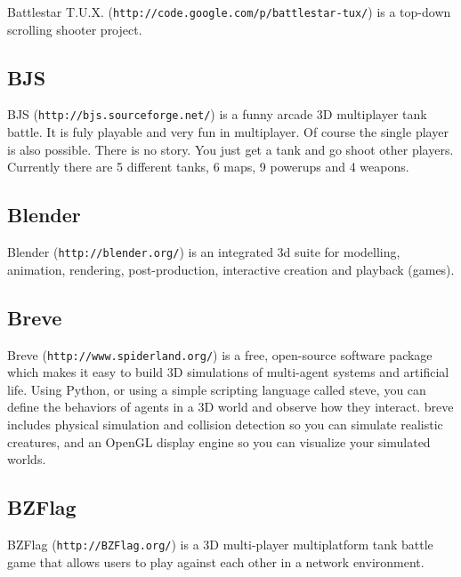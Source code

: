 Battlestar T.U.X. ({\tt http://code.google.com/p/battlestar-\/tux/}) is a top-\/down scrolling shooter project.\subsection{BJS}\label{ftgl-projects_bjs}
BJS ({\tt http://bjs.sourceforge.net/}) is a funny arcade 3D multiplayer tank battle. It is fuly playable and very fun in multiplayer. Of course the single player is also possible. There is no story. You just get a tank and go shoot other players. Currently there are 5 different tanks, 6 maps, 9 powerups and 4 weapons.\subsection{Blender}\label{ftgl-projects_blender}
Blender ({\tt http://blender.org/}) is an integrated 3d suite for modelling, animation, rendering, post-\/production, interactive creation and playback (games).\subsection{Breve}\label{ftgl-projects_breve}
Breve ({\tt http://www.spiderland.org/}) is a free, open-\/source software package which makes it easy to build 3D simulations of multi-\/agent systems and artificial life. Using Python, or using a simple scripting language called steve, you can define the behaviors of agents in a 3D world and observe how they interact. breve includes physical simulation and collision detection so you can simulate realistic creatures, and an OpenGL display engine so you can visualize your simulated worlds.\subsection{BZFlag}\label{ftgl-projects_bzflag}
BZFlag ({\tt http://BZFlag.org/}) is a 3D multi-\/player multiplatform tank battle game that allows users to play against each other in a network environment.

